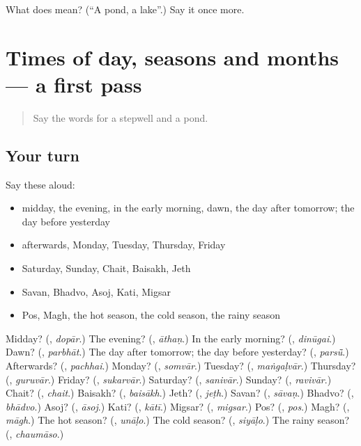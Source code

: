 \begin{tcolorbox}[breakable,colback=teal!4,colframe=teal!35!black,title={Before you move on}]
What does  mean? (\textquotedblleft{}A pond, a lake\textquotedblright{}.) Say it once more.
\end{tcolorbox}
\section[(dialogue)]{Times of day, seasons and months — a first pass}

\label{lesson:MW-R99-first-pass-times-of-day-seasons-and-months}



\begin{quote}
Say the words for a stepwell and a pond.
\end{quote}

\subsection*{Your turn}
Say these aloud:

\begin{itemize}
\raggedright
  \item midday, the evening, in the early morning, dawn, the day after tomorrow; the day before yesterday
  \item afterwards, Monday, Tuesday, Thursday, Friday
  \item Saturday, Sunday, Chait, Baisakh, Jeth
  \item Savan, Bhadvo, Asoj, Kati, Migsar
  \item Pos, Magh, the hot season, the cold season, the rainy season
\end{itemize}

\begin{tcolorbox}[breakable,colback=teal!4,colframe=teal!35!black,title={Before you move on}]
Midday? (\textbf{}, \emph{dopār}.) The evening? (\textbf{}, \emph{āthaṇ}.) In the early morning? (\textbf{}, \emph{dinūgai}.) Dawn? (\textbf{}, \emph{parbhāt}.) The day after tomorrow; the day before yesterday? (\textbf{}, \emph{parsū̃}.) Afterwards? (\textbf{}, \emph{pachhai}.) Monday? (\textbf{}, \emph{somvār}.) Tuesday? (\textbf{}, \emph{maṅgaḷvār}.) Thursday? (\textbf{}, \emph{guruvār}.) Friday? (\textbf{}, \emph{sukarvār}.) Saturday? (\textbf{}, \emph{sanivār}.) Sunday? (\textbf{}, \emph{ravivār}.) Chait? (\textbf{}, \emph{chait}.) Baisakh? (\textbf{}, \emph{baisākh}.) Jeth? (\textbf{}, \emph{jeṭh}.) Savan? (\textbf{}, \emph{sāvaṇ}.) Bhadvo? (\textbf{}, \emph{bhādvo}.) Asoj? (\textbf{}, \emph{āsoj}.) Kati? (\textbf{}, \emph{kātī}.) Migsar? (\textbf{}, \emph{migsar}.) Pos? (\textbf{}, \emph{pos}.) Magh? (\textbf{}, \emph{māgh}.) The hot season? (\textbf{}, \emph{unāḷo}.) The cold season? (\textbf{}, \emph{siyāḷo}.) The rainy season? (\textbf{}, \emph{chaumāso}.)
\end{tcolorbox}
